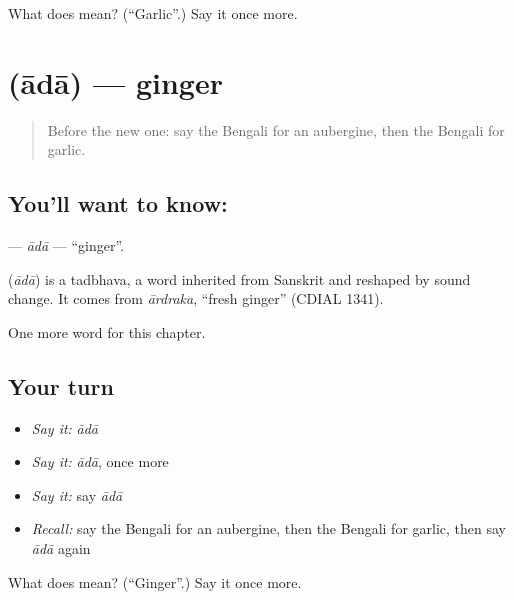 \begin{tcolorbox}[breakable,colback=teal!4,colframe=teal!35!black,title={Before you move on}]
What does  mean? (\textquotedblleft{}Garlic\textquotedblright{}.) Say it once more.
\end{tcolorbox}
\section[\texorpdfstring{\bn{আদা} (ādā)}{আদা (ādā)}]{ (ādā) — ginger}

\label{lesson:BN-C116-ada}



\begin{quote}
Before the new one: say the Bengali for an aubergine, then the Bengali for garlic.
\end{quote}

\subsection*{You'll want to know: }
\textbf{} — \emph{ādā} — \textquotedblleft{}ginger\textquotedblright{}.

\begin{cousinweb}
\textbf{} (\emph{ādā}) is a tadbhava, a word inherited from Sanskrit and reshaped by sound change. It comes from \emph{ārdraka}, \textquotedblleft{}fresh ginger\textquotedblright{} (CDIAL 1341).
\end{cousinweb}

\begin{grammarlens}[title={What you've built}]
One more word for this chapter.
\end{grammarlens}

\subsection*{Your turn}
\begin{itemize}
\raggedright
  \item \emph{Say it:} \emph{ādā}
  \item \emph{Say it:} \emph{ādā}, once more
  \item \emph{Say it:} say \emph{ādā}
  \item \emph{Recall:} say the Bengali for an aubergine, then the Bengali for garlic, then say \emph{ādā} again
\end{itemize}

\begin{tcolorbox}[breakable,colback=teal!4,colframe=teal!35!black,title={Before you move on}]
What does  mean? (\textquotedblleft{}Ginger\textquotedblright{}.) Say it once more.
\end{tcolorbox}
